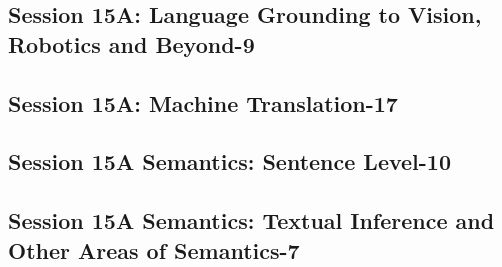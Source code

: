 \subsection{\large Session 15A: Language Grounding to Vision, Robotics and Beyond-9}
\label{parallel-session-15A-trackD}
\TrackDLoc\hfill\sessionchair{}{}
\clearpage
\subsection{\large Session 15A: Machine Translation-17}
\label{parallel-session-15A-trackE}
\TrackELoc\hfill\sessionchair{}{}
\clearpage
\subsection{\large Session 15A Semantics: Sentence Level-10}
\label{parallel-session-15A-trackF}
\TrackFLoc\hfill\sessionchair{}{}
\clearpage
\subsection{\large Session 15A Semantics: Textual Inference and Other Areas of Semantics-7}
\label{parallel-session-15A-trackG}
\TrackGLoc\hfill\sessionchair{}{}
\clearpage


